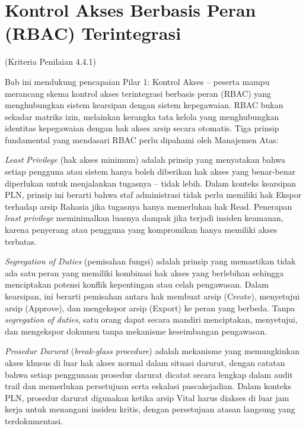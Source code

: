 \documentclass[12pt,a4paper]{report}
\begin{document}
\renewcommand{\thesection}{\thechapter.\arabic{section}}
\chapter{Kontrol Akses Berbasis Peran (RBAC) Terintegrasi}
(Kriteria Penilaian 4.4.1)

Bab ini mendukung pencapaian Pilar 1: Kontrol Akses -- peserta mampu merancang skema kontrol akses terintegrasi berbasis peran (RBAC) yang menghubungkan sistem kearsipan dengan sistem kepegawaian. RBAC bukan sekadar matriks izin, melainkan kerangka tata kelola yang menghubungkan identitas kepegawaian dengan hak akses arsip secara otomatis. Tiga prinsip fundamental yang mendasari RBAC perlu dipahami oleh Manajemen Atas:

\textit{Least Privilege} (hak akses minimum) adalah prinsip yang menyatakan bahwa setiap pengguna atau sistem hanya boleh diberikan hak akses yang benar-benar diperlukan untuk menjalankan tugasnya -- tidak lebih. Dalam konteks kearsipan PLN, prinsip ini berarti bahwa staf administrasi tidak perlu memiliki hak Ekspor terhadap arsip Rahasia jika tugasnya hanya memerlukan hak Read. Penerapan \textit{least privilege} meminimalkan luasnya dampak jika terjadi insiden keamanan, karena penyerang atau pengguna yang kompromikan hanya memiliki akses terbatas.

\textit{Segregation of Duties} (pemisahan fungsi) adalah prinsip yang memastikan tidak ada satu peran yang memiliki kombinasi hak akses yang berlebihan sehingga menciptakan potensi konflik kepentingan atau celah pengawasan. Dalam kearsipan, ini berarti pemisahan antara hak membuat arsip (Create), menyetujui arsip (Approve), dan mengekspor arsip (Export) ke peran yang berbeda. Tanpa \textit{segregation of duties}, satu orang dapat secara mandiri menciptakan, menyetujui, dan mengekspor dokumen tanpa mekanisme keseimbangan pengawasan.

\textit{Prosedur Darurat} (\textit{break-glass procedure}) adalah mekanisme yang memungkinkan akses khusus di luar hak akses normal dalam situasi darurat, dengan catatan bahwa setiap penggunaan prosedur darurat dicatat secara lengkap dalam audit trail dan memerlukan persetujuan serta eskalasi pascakejadian. Dalam konteks PLN, prosedur darurat digunakan ketika arsip Vital harus diakses di luar jam kerja untuk menangani insiden kritis, dengan persetujuan atasan langsung yang terdokumentasi.
\end{document}
